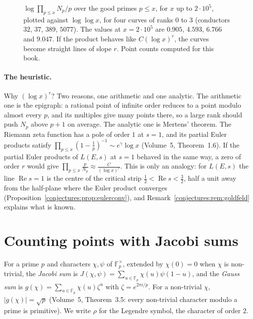 \begin{figure}[ht]
\centering
{}
\caption{$\log\prod_{p\le x}N_p/p$ over the good primes $p\le x$, for $x$ up to $2\cdot10^5$, plotted against $\log\log x$, for four curves of ranks $0$ to $3$
(conductors $32$, $37$, $389$, $5077$). The values at $x=2\cdot10^5$ are $0.905$, $4.593$, $6.766$ and $9.047$. If the product behaves like $C(\log x)^r$,
the curves become straight lines of slope $r$. Point counts computed for this book.}
\label{conjectures:fig:bsd}
\end{figure}

\paragraph{The heuristic.} Why $(\log x)^r$? Two reasons, one arithmetic and one analytic. The arithmetic one is the epigraph: a rational point of infinite
order reduces to a point modulo almost every $p$, and its multiples give many points there, so a large rank should push $N_p$ above $p+1$ on average. The
analytic one is Mertens' theorem. The Riemann zeta function has a pole of order $1$ at $s=1$, and its partial Euler products satisfy
$\prod_{p\le x}(1-\frac1p)^{-1}\sim e^\gamma\log x$ (Volume~5, Theorem~1.6). If the partial Euler products of $L(E,s)$ at $s=1$ behaved in the same way, a zero
of order $r$ would give $\prod_{p\le x}\frac p{N_p}\approx\frac C{(\log x)^r}$. This is only an analogy: for $L(E,s)$ the line $\operatorname{Re}s=1$ is the centre of the critical strip
$\frac12<\operatorname{Re}s<\frac32$, half a unit away from the half-plane where the Euler product converges (Proposition~\ref{conjectures:prop:eulerconv}), and
Remark~\ref{conjectures:rem:goldfeld} explains what is known.

\section{Counting points with Jacobi sums}

For a prime $p$ and characters $\chi,\psi$ of $\mathbb F_p^\times$, extended by $\chi(0)=0$ when $\chi$ is non-trivial, the \emph{Jacobi sum} is
$J(\chi,\psi)=\sum_{u\in\mathbb F_p}\chi(u)\psi(1-u)$, and the \emph{Gauss sum} is $g(\chi)=\sum_{u\in\mathbb F_p}\chi(u)\zeta^u$ with $\zeta=e^{2\pi i/p}$.
For a non-trivial $\chi$, $|g(\chi)|=\sqrt p$ (Volume~5, Theorem~3.5: every non-trivial character modulo a prime is primitive). We write $\rho$ for the
Legendre symbol, the character of order $2$.

